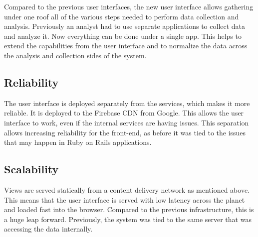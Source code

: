 Compared to the previous user interfaces, the new user interface allows gathering under one roof all of the various steps needed to perform data collection and analysis. Previously an analyst had to use separate applications to collect data and analyze it. Now everything can be done under a single app. This helps to extend the capabilities from the user interface and to normalize the data across the analysis and collection sides of the system.

\subsection{Reliability}
The user interface is deployed separately from the services, which makes it more reliable. It is deployed to the Firebase CDN from Google. This allows the user interface to work, even if the internal services are having issues. This separation allows increasing reliability for the front-end, as before it was tied to the issues that may happen in Ruby on Rails applications.

\subsection{Scalability}

Views are served statically from a content delivery network as mentioned above. This means that the user interface is served with low latency across the planet and loaded fast into the browser. Compared to the previous infrastructure, this is a huge leap forward. Previously, the system was tied to the same server that was accessing the data internally. 
